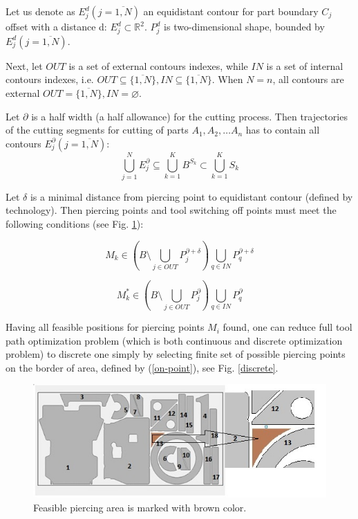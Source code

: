 \documentclass{../download/tPRS2e}
\begin{document}
Let us denote as $E^d_j (j = \overline{1, N})$
an equidistant contour for part boundary $C_j$
offset with a distance d:
$E^d_j \subset \mathbb{R}^2$.
$P^d_j$ is two-dimensional shape, bounded by $E^d_j (j=\overline{1, N})$.

Next, let $OUT$ is a set of external contours indexes,
while $IN$ is a set of internal contours indexes,
i.e. $OUT \subseteq \{\overline{1, N}\},  IN \subseteq \{\overline{1, N}\}$.
When $N = n$, all contours are external $OUT=\{\overline{1, N}\}, IN = \varnothing$.

Let $\partial$  is a half width (a half allowance) for the cutting process.
Then trajectories of the cutting segments for cutting of parts $A_1, A_2, \dots A_n$ has to contain all contours  $E^\partial_j (j = \overline{1, N})$:
$$
\bigcup^N_{j=1} E^\partial_j
\subseteq
\bigcup^K_{k=1} B^{S_k}
\subset
\bigcup^K_{k=1} S_k
$$

Let $\delta$  is a minimal distance from piercing point to equidistant contour (defined by technology).
Then piercing points and tool switching off points must meet the following conditions (see Fig. \ref{piercing-area}):

\begin{equation} \label{on-point}
M_k \in
( B \setminus \bigcup_{j \in OUT} P^{\partial + \delta}_j ) \bigcup_{q \in IN} P^{\partial + \delta}_q
\end{equation}

\begin{equation} \label{off-point}
M_k^* \in
( B \setminus \bigcup_{j \in OUT} P^\partial_j ) \bigcup_{q \in IN} P^\partial_q
\end{equation}

Having all feasible positions for piercing points $M_i$ found,
one can reduce full tool path optimization problem
(which is both continuous and discrete optimization problem)
to discrete one simply by selecting finite set of possible piercing points on the border of area,
defined by (\ref{on-point}), see Fig. \ref{discrete}.

\begin{figure}
\begin{center}
\includegraphics[width=\textwidth]{ppc.jpeg}
\caption{Feasible piercing area is marked with brown color.} \label{piercing-area}
\end{center}
\end{figure}
\end{document}
